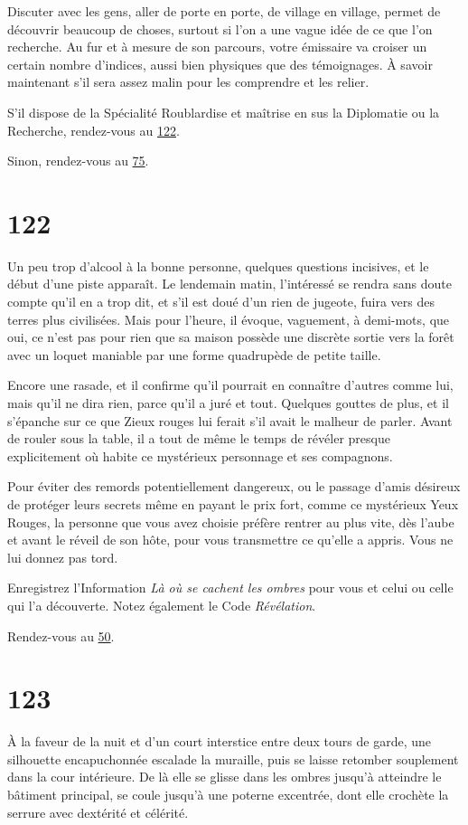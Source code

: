 \documentclass{report}
\newcommand{\gsection}[1]{
    \section{#1}
    \label{section-#1}
}
\newcommand{\glink}[1]{\hyperref[section-#1]{#1}}
\begin{document}
Discuter avec les gens, aller de porte en porte, de village en village, permet de découvrir beaucoup de choses, surtout si l'on a une vague idée de ce que l'on recherche. Au fur et à mesure de son parcours, votre émissaire va croiser un certain nombre d'indices, aussi bien physiques que des témoignages. À savoir maintenant s'il sera assez malin pour les comprendre et les relier.

S'il dispose de la Spécialité Roublardise et maîtrise en sus la Diplomatie ou la Recherche, rendez-vous au \glink{122}.

Sinon, rendez-vous au \glink{75}.

\gsection{122}

Un peu trop d'alcool à la bonne personne, quelques questions incisives, et le début d'une piste apparaît. Le lendemain matin, l'intéressé se rendra sans doute compte qu'il en a trop dit, et s'il est doué d'un rien de jugeote, fuira vers des terres plus civilisées. Mais pour l'heure, il évoque, vaguement, à demi-mots, que oui, ce n'est pas pour rien que sa maison possède une discrète sortie vers la forêt avec un loquet maniable par une forme quadrupède de petite taille.

Encore une rasade, et il confirme qu'il pourrait en connaître d'autres comme lui, mais qu'il ne dira rien, parce qu'il a juré et tout. Quelques gouttes de plus, et il s'épanche sur ce que Zieux rouges lui ferait s'il avait le malheur de parler. Avant de rouler sous la table, il a tout de même le temps de révéler presque explicitement où habite ce mystérieux personnage et ses compagnons.

Pour éviter des remords potentiellement dangereux, ou le passage d'amis désireux de protéger leurs secrets même en payant le prix fort, comme ce mystérieux Yeux Rouges, la personne que vous avez choisie préfère rentrer au plus vite, dès l'aube et avant le réveil de son hôte, pour vous transmettre ce qu'elle a appris. Vous ne lui donnez pas tord.

Enregistrez l'Information \emph{Là où se cachent les ombres} pour vous et celui ou celle qui l'a découverte. Notez également le Code \emph{Révélation}.

Rendez-vous au \glink{50}.

\gsection{123}

À la faveur de la nuit et d'un court interstice entre deux tours de garde, une silhouette encapuchonnée escalade la muraille, puis se laisse retomber souplement dans la cour intérieure. De là elle se glisse dans les ombres jusqu'à atteindre le bâtiment principal, se coule jusqu'à une poterne excentrée, dont elle crochète la serrure avec dextérité et célérité.
\end{document}
